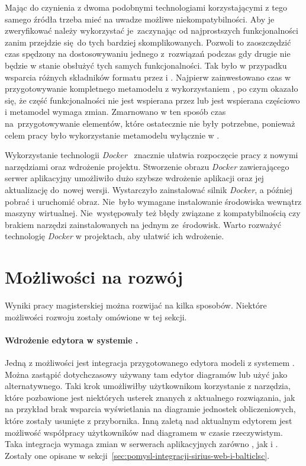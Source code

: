 Mając do czynienia z dwoma podobnymi technologiami korzystającymi z tego samego
źródła trzeba mieć na uwadze możliwe niekompatybilności. Aby je zweryfikować
należy wykorzystać je~zaczynając od najprostszych funkcjonalności zanim
przejdzie się do tych
bardziej skomplikowanych. Pozwoli to zaoszczędzić czas spędzony na
dostosowywaniu jednego z~rozwiązań podczas gdy drugie nie będzie w stanie
obsłużyć tych samych funkcjonalności. Tak było w przypadku wsparcia różnych
składników formatu \Ecore{} przez \SiriusDesktop{} i \SiriusWeb{}. Najpierw
zainwestowano czas w przygotowywanie kompletnego
metamodelu z
wykorzystaniem \SiriusDesktop{}, po czym okazało się, że część
funkcjonalności nie jest wspierana przez \SiriusWeb{} lub jest wspierana
częściowo i metamodel wymaga zmian. Zmarnowano w ten sposób czas
na~przygotowywanie elementów, które ostatecznie nie były potrzebne, ponieważ
celem
pracy było wykorzystanie metamodelu wyłącznie w \SiriusWeb{}.

Wykorzystanie technologii \emph{Docker}~\cite{wikipedia-docker} znacznie
ułatwia rozpoczęcie pracy z
nowymi narzędziami oraz wdrożenie projektu.
Stworzenie obrazu \emph{Docker} zawierającego serwer aplikacyjny \SiriusWeb{}
umożliwiło dużo szybsze wdrożenie aplikacji oraz jej aktualizację
do~nowej wersji. Wystarczyło zainstalować silnik \emph{Docker}, a później
pobrać i uruchomić obraz. Nie~było wymagane instalowanie środowiska \Java{}
wewnątrz maszyny wirtualnej. Nie~występowały też błędy związane z
kompatybilnością czy brakiem narzędzi zainstalowanych na jednym ze~środowisk.
Warto rozważyć technologię \emph{Docker} w projektach, aby ułatwić ich
wdrożenie.

\section{Możliwości na rozwój}

Wyniki pracy magisterskiej można rozwijać na kilka sposobów. Niektóre
możliwości rozwoju zostały omówione w tej sekcji.

\paragraph{Wdrożenie edytora w systemie \BalticLSC{}.}
Jedną z możliwości jest integracja przygotowanego edytora modeli z systemem
\BalticLSC{}. Można zastąpić dotychczasowy używany tam edytor diagramów lub
użyć \SiriusWeb{} jako alternatywnego. Taki krok umożliwiłby użytkownikom
\BalticLSC{} korzystanie z narzędzia, które pozbawione jest niektórych
usterek znanych z aktualnego rozwiązania, jak na przykład brak wsparcia
wyświetlania na diagramie jednostek obliczeniowych, które zostały usunięte z
przybornika.
Inną zaletą \SiriusWeb{} nad aktualnym edytorem jest możliwość współpracy
użytkowników nad diagramem w czasie rzeczywistym. Taka integracja wymaga zmian
w serwerach aplikacyjnych zarówno \SiriusWeb{}, jak i \BalticLSC{}.
Zostały one opisane w
sekcji~\ref{sec:pomysl-integracji-sirius-web-i-balticlsc}.

